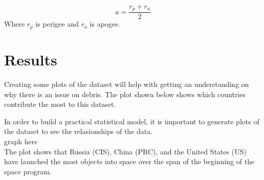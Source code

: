 \documentclass[12pt,a4paper]{article}
\begin{document}
\begin{equation}
a = \frac{r_p + r_a }{2}
\end{equation}
Where $r_p$ is perigee and $r_a$ is apogee.



\section{Results}
Creating some plots of the dataset will help with getting an understanding on why there is an issue on debris. The plot shown below shows which countries contribute the most to this dataset. 

In order to build a practical statistical model, it is important to generate plots of the dataset to see the relasionships of the data.
\\
graph here
\\
The plot shows that Russia (CIS), China (PRC), and the United States (US) have launched the most objects into space over the span of the beginning of the space program. 
\end{document}
